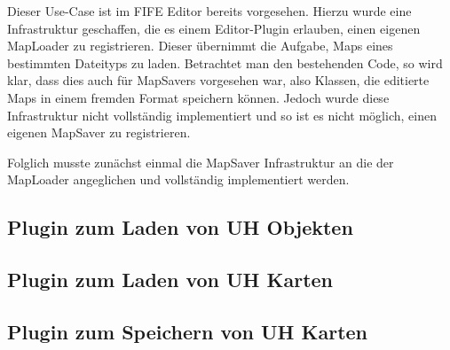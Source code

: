 Dieser Use-Case ist im FIFE Editor bereits vorgesehen. Hierzu wurde eine Infrastruktur geschaffen, die
es einem Editor-Plugin erlauben, einen eigenen MapLoader zu registrieren. Dieser übernimmt die
Aufgabe, Maps eines bestimmten Dateityps zu laden. Betrachtet man den bestehenden Code, so wird klar,
dass dies auch für MapSavers vorgesehen war, also Klassen, die editierte Maps in einem fremden Format
speichern können. Jedoch wurde diese Infrastruktur nicht vollständig implementiert und so ist es
nicht möglich, einen eigenen MapSaver zu registrieren.

Folglich musste zunächst einmal die MapSaver Infrastruktur an die der MapLoader angeglichen und vollständig
implementiert werden.

\subsection{Plugin zum Laden von UH Objekten}
\subsection{Plugin zum Laden von UH Karten}
\subsection{Plugin zum Speichern von UH Karten}



